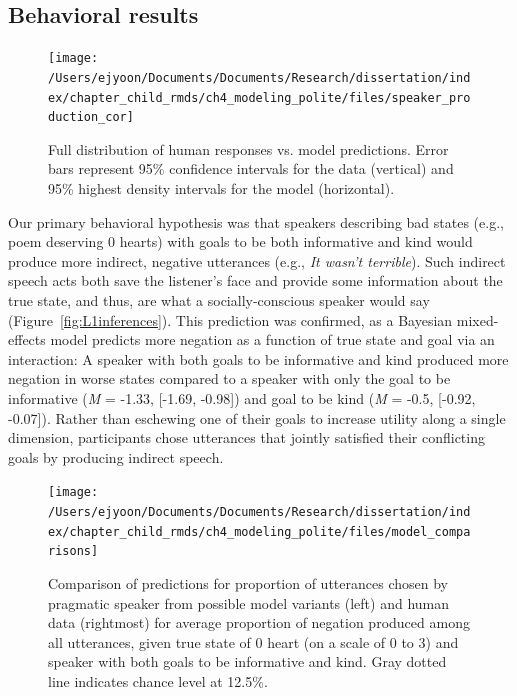 \documentclass[oneside]{report}
\begin{document}
\subsection{Behavioral results}\label{behavioral-results}
\begin{figure}[!t]

{\centering \texttt{[image: /Users/ejyoon/Documents/Documents/Research/dissertation/index/chapter\_child\_rmds/ch4\_modeling\_polite/files/speaker\_production\_cor]} 

}

\caption[Comparison between human responses and model predictions.]{Full distribution of human responses vs. model predictions. Error bars represent 95\% confidence intervals for the data (vertical) and 95\% highest density intervals for the model (horizontal).}\label{fig:variance}
\end{figure}
Our primary behavioral hypothesis was that speakers describing bad
states (e.g., poem deserving 0 hearts) with goals to be both informative
and kind would produce more indirect, negative utterances (e.g.,
\emph{It wasn't terrible}). Such indirect speech acts both save the
listener's face and provide some information about the true state, and
thus, are what a socially-conscious speaker would say
(Figure~\ref{fig:L1inferences}). This prediction was confirmed, as a
Bayesian mixed-effects model predicts more negation as a function of
true state and goal via an interaction: A speaker with both goals to be
informative and kind produced more negation in worse states compared to
a speaker with only the goal to be informative (\emph{M} = -1.33,
{[}-1.69, -0.98{]}) and goal to be kind (\emph{M} = -0.5, {[}-0.92,
-0.07{]}). Rather than eschewing one of their goals to increase utility
along a single dimension, participants chose utterances that jointly
satisfied their conflicting goals by producing indirect speech.
\begin{figure}[!t]

{\centering \texttt{[image: /Users/ejyoon/Documents/Documents/Research/dissertation/index/chapter\_child\_rmds/ch4\_modeling\_polite/files/model\_comparisons]} 

}

\caption[Comparison of model variant fits.]{Comparison of predictions for proportion of utterances chosen by pragmatic speaker from possible model variants (left) and human data (rightmost) for average proportion of negation produced among all utterances, given true state of 0 heart (on a scale of 0 to 3) and speaker with both goals to be informative and kind. Gray dotted line indicates chance level at 12.5\%.}\label{fig:comparison}
\end{figure}
\end{document}
